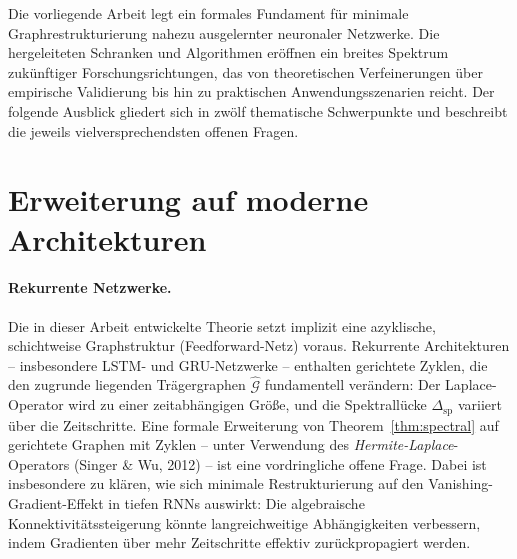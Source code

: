 ﻿\documentclass[12pt, a4paper, openany]{report}
\newcommand{\calG}{\mathcal{G}}
\begin{document}
Die vorliegende Arbeit legt ein formales Fundament für minimale
Graphrestrukturierung nahezu ausgelernter neuronaler Netzwerke.  Die
hergeleiteten Schranken und Algorithmen eröffnen ein breites Spektrum
zukünftiger Forschungsrichtungen, das von theoretischen Verfeinerungen
über empirische Validierung bis hin zu praktischen Anwendungsszenarien
reicht.  Der folgende Ausblick gliedert sich in zwölf thematische
Schwerpunkte und beschreibt die jeweils vielversprechendsten offenen
Fragen.

\section{Erweiterung auf moderne Architekturen}
\label{sec:outlook_arch}

\paragraph{Rekurrente Netzwerke.}
Die in dieser Arbeit entwickelte Theorie setzt implizit eine azyklische,
schichtweise Graphstruktur (Feedforward-Netz) voraus.  Rekurrente
Architekturen -- insbesondere LSTM- und GRU-Netzwerke -- enthalten
gerichtete Zyklen, die den zugrunde liegenden Trägergraphen $\hat{\calG}$
fundamentell verändern: Der Laplace-Operator wird zu einer zeitabhängigen
Größe, und die Spektrallücke $\Delta_{\mathrm{sp}}$ variiert über die
Zeitschritte.  Eine formale Erweiterung von Theorem~\ref{thm:spectral}
auf gerichtete Graphen mit Zyklen -- unter Verwendung des
\emph{Hermite-Laplace}-Operators (Singer \& Wu, 2012) -- ist eine
vordringliche offene Frage.  Dabei ist insbesondere zu klären, wie sich
minimale Restrukturierung auf den Vanishing-Gradient-Effekt in tiefen
RNNs auswirkt: Die algebraische Konnektivitätssteigerung könnte
langreichweitige Abhängigkeiten verbessern, indem Gradienten über mehr
Zeitschritte effektiv zurückpropagiert werden.
\end{document}
